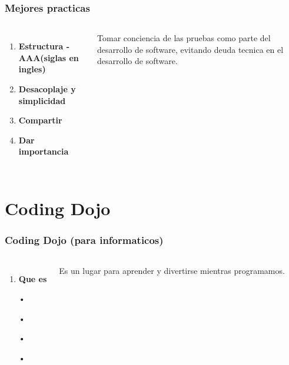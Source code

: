 \documentclass{beamer}
\begin{document}
\begin{frame}
\frametitle{Mejores practicas}
\begin{columns}[c] %

\begin{enumerate}
\item \textbf{Estructura - AAA(siglas en ingles)}
\item \textbf{Desacoplaje y simplicidad}
\item \textbf{Compartir}
\item \textbf{Dar importancia}

\end{enumerate}

Tomar conciencia de las pruebas como parte del desarrollo de software, evitando deuda tecnica en el desarrollo de software.
\end{columns}
\end{frame}

\section{Coding Dojo}
\begin{frame}
\frametitle{Coding Dojo (para informaticos)}
\begin{columns}[c] %

\begin{enumerate}
\item \textbf{Que es}
\item[•]
\item[•]
\item[•]
\item[•]

\end{enumerate}

Es un lugar para aprender y divertirse mientras programamos.
\end{columns}
\end{frame}
\end{document}
